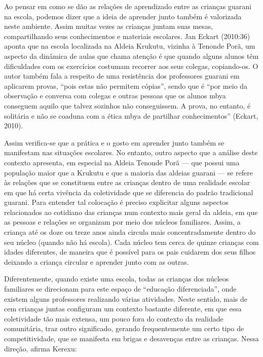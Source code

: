 \documentclass{article}
\begin{document}
Ao pensar em como se d\~ao as rela\c{c}\~oes de aprendizado entre as
crian\c{c}as guarani na escola, podemos dizer que a ideia de aprender
junto tamb\'em \'e valorizada neste ambiente. Assim muitas vezes as
crian\c{c}as juntam suas mesas, compartilhando seus conhecimentos e
materiais escolares. Jan Eckart (2010:36) aponta que na escola
localizada na Aldeia Krukutu, vizinha \`a Tenonde Por\~a, um aspecto da
din\^amica de aulas que chama aten\c{c}\~ao \'e que quando alguns
alunos t\^em dificuldades com os exerc\'icios costumam recorrer aos
seus colegas, copiando-os. O autor tamb\'em fala a respeito de uma
resist\^encia dos professores guarani em aplicarem provas,
{\textquotedblleft}pois estas n\~ao permitem
c\'opias{\textquotedblright}, sendo que \'e {\textquotedblleft}por meio
da observa\c{c}\~ao e conversa com colegas e outras pessoas que os
alunos mbya conseguem aquilo que talvez sozinhos n\~ao conseguissem. A
prova, no entanto, \'e solit\'aria e n\~ao se coaduna com a \'etica
mbya de partilhar conhecimentos{\textquotedblright} (Eckart, 2010).

Assim verifica-se que a pr\'atica e o gosto em aprender junto tamb\'em
se manifestam nas situa\c{c}\~oes escolares. No entanto, outro aspecto
que a an\'alise deste contexto apresenta, em especial na Aldeia Tenonde
Por\~a --- que possui uma popula\c{c}\~ao maior que a Krukutu e que a
maioria das aldeias guarani --- se refere \`as rela\c{c}\~oes que se
constituem entre as crian\c{c}as dentro de uma realidade escolar em que
h\'a certa viv\^encia da coletividade que se diferencia do padr\~ao
tradicional guarani. Para entender tal coloca\c{c}\~ao \'e preciso
explicitar alguns aspectos relacionados ao cotidiano das crian\c{c}as
num contexto mais geral da aldeia, em que as pessoas e rela\c{c}\~oes
se organizam por meio dos n\'ucleos familiares. Assim, a crian\c{c}a
at\'e os doze ou treze anos ainda circula mais concentradamente dentro
do seu n\'ucleo (quando n\~ao h\'a escola). Cada n\'ucleo tem cerca de
quinze crian\c{c}as com idades diferentes, de maneira que \'e
poss\'ivel para os pais cuidarem dos seus filhos deixando a crian\c{c}a
circular e aprender junto com as outras.

Diferentemente, quando existe uma escola, todas as crian\c{c}as dos
n\'ucleos familiares se direcionam para este espa\c{c}o de
{\textquotedblleft}educa\c{c}\~ao diferenciada{\textquotedblright},
onde existem alguns professores realizando v\'arias atividades. Neste
sentido, mais de cem crian\c{c}as juntas configuram um contexto
bastante diferente, em que essa coletividade t\~ao mais extensa, um
pouco fora do contexto da realidade comunit\'aria, traz outro
significado, gerando frequentemente um certo tipo de competitividade,
que se manifesta em brigas e desaven\c{c}as entre as crian\c{c}as.
Nessa dire\c{c}\~ao, afirma Kerexu:
\end{document}
